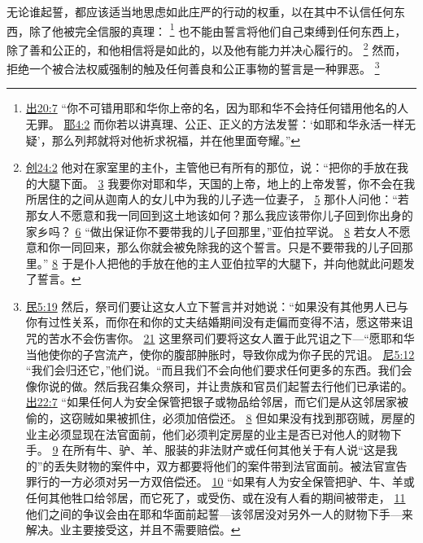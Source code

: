 \documentclass[12pt, a4paper, oneside]{ctexart}
\newcounter{parnum}[section]
\newcommand{\N}{%
   \noindent\refstepcounter{parnum}%
    \makebox[\parindent][l]{\textbf{\arabic{parnum}.}}}
\begin{document}
\N 无论谁起誓，都应该适当地思虑如此庄严的行动的权重，以在其中不认信任何东西，除了他被完全信服的真理：
	\footnote {
		\href{https://biblehub.com/exodus/20-7.htm}{出20:7} “你不可错用耶和华你上帝的名，因为耶和华不会持任何错用他名的人无罪。
		\href{https://biblehub.com/jeremiah/4-2.htm}{耶4:2} 而你若以讲真理、公正、正义的方法发誓：‘如耶和华永活一样无疑’，那么列邦就将对他祈求祝福，并在他里面夸耀。”
	}
	也不能由誓言将他们自己束缚到任何东西上，除了善和公正的，和他相信将是如此的，以及他有能力并决心履行的。
	\footnote {
		\href{https://biblehub.com/genesis/24-2.htm}{创24:2} 他对在家室里的主仆，主管他已有所有的那位，说：“把你的手放在我的大腿下面。
		\href{https://biblehub.com/genesis/24-3.htm}{3} 我要你对耶和华，天国的上帝，地上的上帝发誓，你不会在我所居住的之间从迦南人的女儿中为我的儿子选一位妻子，
		\href{https://biblehub.com/genesis/24-5.htm}{5} 那仆人问他：“若那女人不愿意和我一同回到这土地该如何？那么我应该带你儿子回到你出身的家乡吗？
		\href{https://biblehub.com/genesis/24-6.htm}{6} “做出保证你不要带我的儿子回那里，”亚伯拉罕说。
		\href{https://biblehub.com/genesis/24-8.htm}{8} 若女人不愿意和你一同回来，那么你就会被免除我的这个誓言。只是不要带我的儿子回那里。”
		\href{https://biblehub.com/genesis/24-8.htm}{8} 于是仆人把他的手放在他的主人亚伯拉罕的大腿下，并向他就此问题发了誓言。
	}
	然而，拒绝一个被合法权威强制的触及任何善良和公正事物的誓言是一种罪恶。
	\footnote {
		\href{https://biblehub.com/numbers/5-19.htm}{民5:19} 然后，祭司们要让这女人立下誓言并对她说：“如果没有其他男人已与你有过性关系，而你在和你的丈夫结婚期间没有走偏而变得不洁，愿这带来诅咒的苦水不会伤害你。
		\href{https://biblehub.com/numbers/5-21.htm}{21} 这里祭司们要将这女人置于此咒诅之下---“愿耶和华当他使你的子宫流产，使你的腹部肿胀时，导致你成为你子民的咒诅。
		\href{https://biblehub.com/nehemiah/5-12.htm}{尼5:12} “我们会归还它，”他们说。“而且我们不会向他们要求任何更多的东西。我们会像你说的做。然后我召集众祭司，并让贵族和官员们起誓去行他们已承诺的。
		\href{https://biblehub.com/exodus/22-7.htm}{出22:7} “如果任何人为安全保管把银子或物品给邻居，而它们是从这邻居家被偷的，这窃贼如果被抓住，必须加倍偿还。
		\href{https://biblehub.com/exodus/22-8.htm}{8} 但如果没有找到那窃贼，房屋的业主必须显现在法官面前，他们必须判定房屋的业主是否已对他人的财物下手。
		\href{https://biblehub.com/exodus/22-9.htm}{9} 在所有牛、驴、羊、服装的非法财产或任何其他关于有人说“这是我的”的丢失财物的案件中，双方都要将他们的案件带到法官面前。被法官宣告罪行的一方必须对另一方双倍偿还。
		\href{https://biblehub.com/exodus/22-10.htm}{10} “如果有人为安全保管把驴、牛、羊或任何其他牲口给邻居，而它死了，或受伤、或在没有人看的期间被带走，
		\href{https://biblehub.com/exodus/22-11.htm}{11} 他们之间的争议会由在耶和华面前起誓---该邻居没对另外一人的财物下手---来解决。业主要接受这，并且不需要赔偿。
	}
\end{document}
